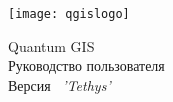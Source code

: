 
\begin{titlepage}
\begin{center}

\begin{center}
\texttt{[image: qgislogo]}
\end{center}

\Huge{Quantum GIS}\\
\vspace{0.5cm}
\Large{Руководство пользователя} \\
\vspace{0.5cm}
\Large{Версия ~\CURRENT \textsl{'Tethys'}}

\end{center}
\end{titlepage}
